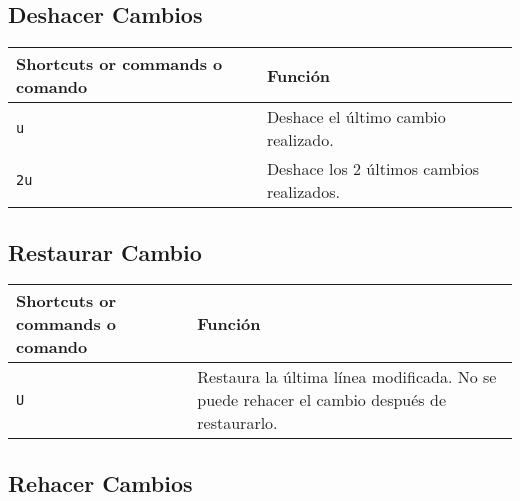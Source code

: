 \documentclass[
  doc,
  floatsintext,
  longtable,
  a4paper,
  nolmodern,
  notxfonts,
  notimes,
  colorlinks=true,linkcolor=blue,citecolor=blue,urlcolor=blue]{apa7}
\begin{document}
\subsection{Deshacer Cambios}\label{deshacer-cambios}

\begin{longtable}[]{@{}
  >{\raggedright\arraybackslash}p{}
  >{\raggedright\arraybackslash}p{}@{}}
\toprule\noalign{}
\begin{minipage}[b]{\linewidth}\raggedright
Shortcuts or commands o comando
\end{minipage} & \begin{minipage}[b]{\linewidth}\raggedright
Función
\end{minipage} \\
\midrule\noalign{}
\endhead
\bottomrule\noalign{}
\endlastfoot
\texttt{u} & Deshace el último cambio realizado. \\
\texttt{2u} & Deshace los 2 últimos cambios realizados. \\
\end{longtable}

\subsection{Restaurar Cambio}\label{restaurar-cambio}

\begin{longtable}[]{@{}
  >{\raggedright\arraybackslash}p{}
  >{\raggedright\arraybackslash}p{}@{}}
\toprule\noalign{}
\begin{minipage}[b]{\linewidth}\raggedright
Shortcuts or commands o comando
\end{minipage} & \begin{minipage}[b]{\linewidth}\raggedright
Función
\end{minipage} \\
\midrule\noalign{}
\endhead
\bottomrule\noalign{}
\endlastfoot
\texttt{U} & Restaura la última línea modificada. No se puede rehacer el
cambio después de restaurarlo. \\
\end{longtable}

\subsection{Rehacer Cambios}\label{rehacer-cambios}
\end{document}
